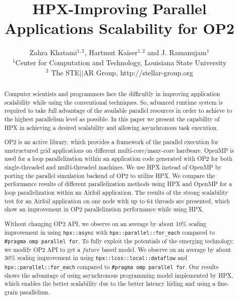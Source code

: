 \documentclass[conference]{IEEEtran}
\begin{document}





%

\title{HPX-Improving Parallel Applications Scalability for OP2}
\author{Zahra Khatami$^{1,2}$, Hartmut Kaiser$^{1,2}$ and J. Ramanujam$^{1}$ \\$^{1}$Center for Computation and Technology, Louisiana State University\\$^{2}$ The STE$||$AR Group, http://stellar-group.org
}
   
\maketitle

\begin{abstract}

Computer scientists and programmers face the difficultly in improving application scalability while using the conventional techniques. So, advanced runtime system is required to take full advantage of the available parallel resources in order to achieve to the highest parallelism level as possible. In this paper we present the capability of HPX in achieving a desired scalability and allowing asynchronous task execution.

OP2 is an active library, which provides a framework of the parallel execution for unstructured grid applications on different multi-core/many-core hardware.  OpenMP is used for a loop parallelization within an application code generated with OP2 for both single-threaded and multi-threaded machines. We use HPX instead of OpenMP by porting the parallel simulation backend of OP2 to utilize HPX. We compare the performance results of different parallelization methods using HPX and OpenMP for a loop parallelization within an Airfoil application. The results of the strong scalability test for an Airfoil application on one node with up to 64 threads are presented, which show an improvement in OP2 parallelization performance while using HPX. 

Without changing OP2 API, we observe on an average by about 10\% scaling improvement in using \texttt{hpx::async} with \texttt{hpx::parallel::for\_each} compared to \texttt{\#pragma omp parallel for}. To fully exploit the potentials of the emerging technology, we modify OP2 API to get a $future$ based model. We observe on an average by about 30\% scaling improvement in using \texttt{hpx::lcos::local::dataflow} and \texttt{hpx::parallel::for\_each} compared to \texttt{\#pragma omp parallel for}. Our results shows the advantage of using asynchronous programming model implemented by HPX, which enables the better scalability due to the better latency hiding and using a fine-grain parallelism.




\end{abstract}
\end{document}
